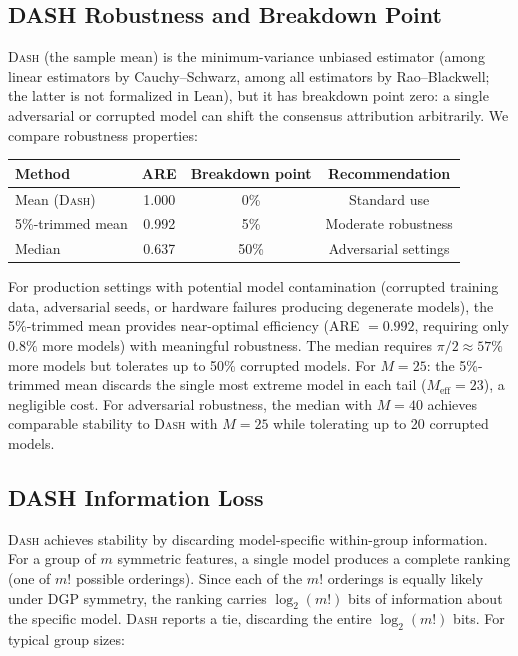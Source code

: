 \documentclass{article}
\newcommand{\DASH}{\textsc{Dash}}
\begin{document}
\subsection{DASH Robustness and Breakdown Point}
\label{sec:dash-robustness}

\DASH{} (the sample mean) is the minimum-variance unbiased estimator (among linear estimators by Cauchy--Schwarz, among all estimators by Rao--Blackwell; the latter is not formalized in Lean), but it has breakdown point zero: a single adversarial or corrupted model can shift the consensus attribution arbitrarily. We compare robustness properties:

\begin{center}
\small
\begin{tabular}{@{}lccc@{}}
\toprule
Method & ARE & Breakdown point & Recommendation \\
\midrule
Mean (\DASH{}) & 1.000 & 0\% & Standard use \\
5\%-trimmed mean & 0.992 & 5\% & Moderate robustness \\
Median & 0.637 & 50\% & Adversarial settings \\
\bottomrule
\end{tabular}
\end{center}

For production settings with potential model contamination (corrupted training data, adversarial seeds, or hardware failures producing degenerate models), the 5\%-trimmed mean provides near-optimal efficiency (ARE $= 0.992$, requiring only $0.8\%$ more models) with meaningful robustness. The median requires $\pi/2 \approx 57\%$ more models but tolerates up to 50\% corrupted models. For $M = 25$: the 5\%-trimmed mean discards the single most extreme model in each tail ($M_{\text{eff}} = 23$), a negligible cost. For adversarial robustness, the median with $M = 40$ achieves comparable stability to \DASH{} with $M = 25$ while tolerating up to 20 corrupted models.

\subsection{DASH Information Loss}
\label{sec:info-loss}

\DASH{} achieves stability by discarding model-specific within-group information. For a group of $m$ symmetric features, a single model produces a complete ranking (one of $m!$ possible orderings). Since each of the $m!$ orderings is equally likely under DGP symmetry, the ranking carries $\log_2(m!)$ bits of information about the specific model. \DASH{} reports a tie, discarding the entire $\log_2(m!)$ bits. For typical group sizes:
\end{document}
